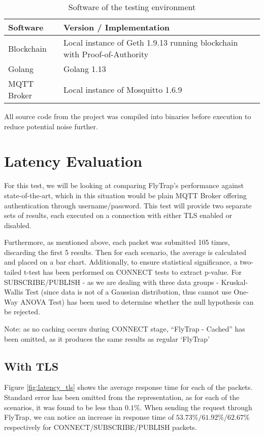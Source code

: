 \begin{table}[h]
\centering
\begin{tabular}{|l|l|}
\hline
\textbf{Software} & \textbf{Version / Implementation}                                        \\ \hline
Blockchain        & Local instance of Geth 1.9.13 running blockchain with Proof-of-Authority \\ \hline
Golang            & Golang 1.13                                                              \\ \hline
MQTT Broker       & Local instance of Mosquitto 1.6.9                                        \\ \hline
\end{tabular}
\caption{Software of the testing environment}
\label{tab:sw}
\end{table}

All source code from the project was compiled into binaries before execution to reduce potential noise further.

\section{Latency Evaluation}
For this test, we will be looking at comparing FlyTrap's performance against state-of-the-art, which in this situation would be plain MQTT Broker offering authentication through username/password. This test will provide two separate sets of results, each executed on a connection with either TLS enabled or disabled.

Furthermore, as mentioned above, each packet was submitted 105 times, discarding the first 5 results. Then for each scenario, the average is calculated and placed on a bar chart. Additionally, to ensure statistical significance, a two-tailed t-test has been performed on CONNECT tests to extract p-value. For SUBSCRIBE/PUBLISH - as we are dealing with three data groups - Kruskal-Wallis Test (since data is not of a Gaussian distribution, thus cannot use One-Way ANOVA Test) has been used to determine whether the null hypothesis can be rejected.

Note: as no caching occurs during CONNECT stage, ``FlyTrap - Cached'' has been omitted, as it produces the same results as regular `FlyTrap'

\subsection{With TLS}
Figure \ref{fig:latency_tls} shows the average response time for each of the packets. Standard error has been omitted from the representation, as for each of the scenarios, it was found to be less than $0.1\%$. When sending the request through FlyTrap, we can notice an increase in response time of $53.73\%/61.92\%/62.67\%$ respectively for CONNECT/SUBSCRIBE/PUBLISH packets.

